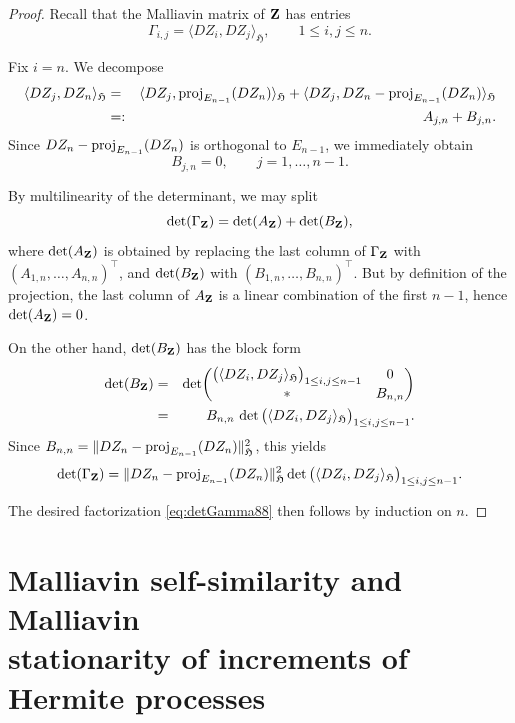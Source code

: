 \documentclass[a4paper,10pt]{article}
\theoremstyle{definition}
\theoremstyle{plain}
\newcommand\HHH{\mathfrak{H}}
\newcommand\1{\mathbbm{1}}
\begin{document}
\begin{proof}
Recall that the Malliavin matrix of ${\bf Z}$ has entries
\[
\Gamma_{i,j}=\langle DZ_i, DZ_j\rangle_{\HHH}, \qquad 1\le i,j\le n.
\]

Fix $i=n$. We decompose
\begin{eqnarray*}
\langle DZ_j, DZ_n\rangle_{\HHH}
&=& \langle DZ_j, {\rm proj}_{E_{n-1}}(DZ_n)\rangle_{\HHH}
  + \langle DZ_j, DZ_n-{\rm proj}_{E_{n-1}}(DZ_n)\rangle_{\HHH}\\
&=:& A_{j,n}+B_{j,n}.
\end{eqnarray*}
Since $DZ_n-{\rm proj}_{E_{n-1}}(DZ_n)$ is orthogonal to $E_{n-1}$, we immediately obtain
\[
B_{j,n}=0,\qquad j=1,\ldots,n-1.
\]

By multilinearity of the determinant, we may split
\[
\det(\Gamma_{\bf Z})=\det(A_{\bf Z})+\det(B_{\bf Z}),
\]
where $\det(A_{\bf Z})$ is obtained by replacing the last column of $\Gamma_{\bf Z}$ with $(A_{1,n},\ldots,A_{n,n})^\top$, and $\det(B_{\bf Z})$ with $(B_{1,n},\ldots,B_{n,n})^\top$.
But by definition of the projection, the last column of $A_{\bf Z}$ is a linear combination of the first $n-1$, hence $\det(A_{\bf Z})=0$.  

On the other hand, $\det(B_{\bf Z})$ has the block form
\begin{eqnarray*}
\det(B_{\bf Z})&=&
\det\!\begin{pmatrix}
\big(\langle DZ_i,DZ_j\rangle_{\HHH}\big)_{1\le i,j\le n-1} & 0 \\
\ast & B_{n,n}
\end{pmatrix}\\
&=& B_{n,n}\,\det\big(\langle DZ_i,DZ_j\rangle_{\HHH}\big)_{1\le i,j\le n-1}.
\end{eqnarray*}
Since $B_{n,n}=\|DZ_n-{\rm proj}_{E_{n-1}}(DZ_n)\|_{\HHH}^2$, this yields
\[
\det(\Gamma_{\bf Z})=\|DZ_n-{\rm proj}_{E_{n-1}}(DZ_n)\|_{\HHH}^2
\det\big(\langle DZ_i,DZ_j\rangle_{\HHH}\big)_{1\le i,j\le n-1}.
\]

The desired factorization \eqref{eq:detGamma88} then follows by induction on $n$.
\end{proof}




\section{Malliavin self-similarity and Malliavin \\stationarity of increments of Hermite processes} \label{sec:malliavinselfsimilarity}
\end{document}
